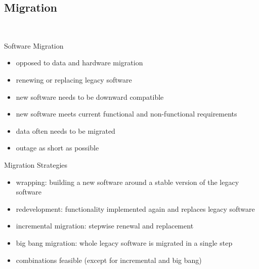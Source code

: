 
\subsection{Migration}
\begin{frame}{\insertsubsection\ \mytitlesource{\ludewiglichter}}
	\begin{fancycolumns}
		\begin{definition}{Software Migration}
			\begin{itemize}
				\item opposed to data and hardware migration
				\item renewing or replacing legacy software
				\item new software needs to be downward compatible
				\item new software meets current functional and non-functional requirements
				\item data often needs to be migrated
				\item outage as short as possible
			\end{itemize}
		\end{definition}
		\nextcolumn
		\begin{note}{Migration Strategies}
			\begin{itemize}
				\item wrapping: building a new software around a stable version of the legacy software
				\item redevelopment: functionality implemented again and replaces legacy software
				\item incremental migration: stepwise renewal and replacement
				\item big bang migration: whole legacy software is migrated in a single step
				\item combinations feasible (except for incremental and big bang)
			\end{itemize}
		\end{note}
	\end{fancycolumns}
\end{frame}




